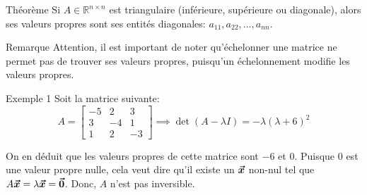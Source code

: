 \documentclass[a4paper]{article}
\begin{document}
\begin{parag}{Théorème}
    Si $A \in \mathbb{R}^{n \times n}$ est triangulaire (inférieure, supérieure ou diagonale), alors ses valeurs propres sont ses entités diagonales: $a_{11}, a_{22}, \ldots, a_{nn}$.

    \begin{subparag}{Remarque}
        Attention, il est important de noter qu'échelonner une matrice ne permet pas de trouver ses valeurs propres, puisqu'un échelonnement modifie les valeurs propres.
    \end{subparag}
\end{parag}

\begin{parag}{Exemple 1}
    Soit la matrice suivante: 
    \[A = \begin{bmatrix} -5 & 2 & 3 \\ 3 & -4 & 1 \\ 1 & 2 & -3 \end{bmatrix} \implies \det\left(A - \lambda I\right) = -\lambda\left(\lambda + 6\right)^2\]
    
    On en déduit que les valeurs propres de cette matrice sont $-6$ et $0$. Puisque $0$ est une valeur propre nulle, cela veut dire qu'il existe un $\bm{\protect\vec{x}}$ non-nul tel que $A\bm{\protect\vec{x}} = \lambda \bm{\protect\vec{x}} = \bm{\protect\vec{0}}$. Donc, $A$ n'est pas inversible.
\end{parag}
\end{document}
